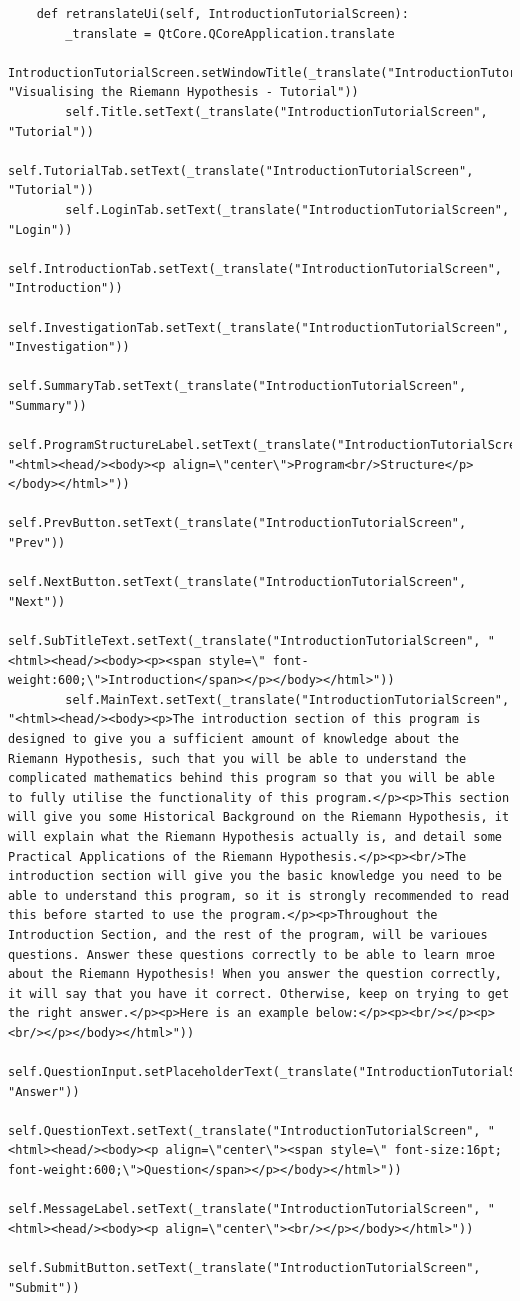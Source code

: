 \documentclass{article}
\begin{document}
\begin{lstlisting}
    def retranslateUi(self, IntroductionTutorialScreen):
        _translate = QtCore.QCoreApplication.translate
        IntroductionTutorialScreen.setWindowTitle(_translate("IntroductionTutorialScreen", "Visualising the Riemann Hypothesis - Tutorial"))
        self.Title.setText(_translate("IntroductionTutorialScreen", "Tutorial"))
        self.TutorialTab.setText(_translate("IntroductionTutorialScreen", "Tutorial"))
        self.LoginTab.setText(_translate("IntroductionTutorialScreen", "Login"))
        self.IntroductionTab.setText(_translate("IntroductionTutorialScreen", "Introduction"))
        self.InvestigationTab.setText(_translate("IntroductionTutorialScreen", "Investigation"))
        self.SummaryTab.setText(_translate("IntroductionTutorialScreen", "Summary"))
        self.ProgramStructureLabel.setText(_translate("IntroductionTutorialScreen", "<html><head/><body><p align=\"center\">Program<br/>Structure</p></body></html>"))
        self.PrevButton.setText(_translate("IntroductionTutorialScreen", "Prev"))
        self.NextButton.setText(_translate("IntroductionTutorialScreen", "Next"))
        self.SubTitleText.setText(_translate("IntroductionTutorialScreen", "<html><head/><body><p><span style=\" font-weight:600;\">Introduction</span></p></body></html>"))
        self.MainText.setText(_translate("IntroductionTutorialScreen", "<html><head/><body><p>The introduction section of this program is designed to give you a sufficient amount of knowledge about the Riemann Hypothesis, such that you will be able to understand the complicated mathematics behind this program so that you will be able to fully utilise the functionality of this program.</p><p>This section will give you some Historical Background on the Riemann Hypothesis, it will explain what the Riemann Hypothesis actually is, and detail some Practical Applications of the Riemann Hypothesis.</p><p><br/>The introduction section will give you the basic knowledge you need to be able to understand this program, so it is strongly recommended to read this before started to use the program.</p><p>Throughout the Introduction Section, and the rest of the program, will be varioues questions. Answer these questions correctly to be able to learn mroe about the Riemann Hypothesis! When you answer the question correctly, it will say that you have it correct. Otherwise, keep on trying to get the right answer.</p><p>Here is an example below:</p><p><br/></p><p><br/></p></body></html>"))
        self.QuestionInput.setPlaceholderText(_translate("IntroductionTutorialScreen", "Answer"))
        self.QuestionText.setText(_translate("IntroductionTutorialScreen", "<html><head/><body><p align=\"center\"><span style=\" font-size:16pt; font-weight:600;\">Question</span></p></body></html>"))
        self.MessageLabel.setText(_translate("IntroductionTutorialScreen", "<html><head/><body><p align=\"center\"><br/></p></body></html>"))
        self.SubmitButton.setText(_translate("IntroductionTutorialScreen", "Submit"))
\end{lstlisting}
\end{document}
